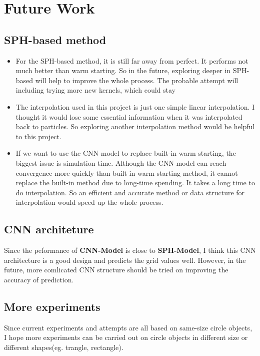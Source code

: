 \section{Future Work}
\subsection{SPH-based method}
\begin{itemize}
    \item For the SPH-based method, it is still far away from perfect. It performs not much better than warm starting. So in the future, exploring deeper in SPH-based will help to improve the whole process. The probable attempt will including trying more new kernels, which could stay 
    \item The interpolation used in this project is just one simple linear interpolation. I thought it would lose some essential information when it was interpolated back to particles. So exploring another interpolation method would be helpful to this project.
    \item If we want to use the CNN model to replace built-in warm starting, the biggest issue is simulation time. Although the CNN model can reach convergence more quickly than built-in warm starting method, it cannot replace the built-in method due to long-time spending. It takes a long time to do interpolation. So an efficient and accurate method or data structure for interpolation would speed up the whole process.
\end{itemize}

\subsection{CNN architeture}
Since the peformance of \textbf{CNN-Model} is close to \textbf{SPH-Model}, I think this CNN architecture is a good design and predicts the grid values well. However, in the future, more comlicated CNN structure should be tried on improving the accuracy of prediction.


\subsection{More experiments}
Since current experiments and attempts are all based on same-size circle objects, I hope more experiments can be carried out on circle objects in different size or different shapes(eg. trangle, rectangle).